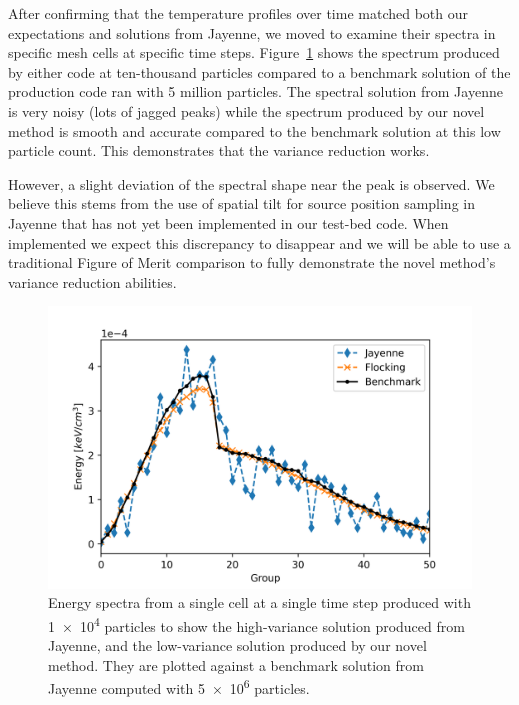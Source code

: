 After confirming that the temperature profiles over time matched both our expectations and solutions from Jayenne, we moved to examine their spectra in specific mesh cells at specific time steps. 
Figure~\ref{fig:10kvar} shows the spectrum produced by either code at ten-thousand particles compared to a benchmark solution of the production code ran with 5 million particles. 
The spectral solution from Jayenne is very noisy (lots of jagged peaks) while the spectrum produced by our novel method is smooth and accurate compared to the benchmark solution at this low particle count.
This demonstrates that the variance reduction works.

However, a slight deviation of the spectral shape near the peak is observed.
We believe this stems from the use of spatial tilt for source position sampling in Jayenne that has not yet been implemented in our test-bed code.
When implemented we expect this discrepancy to disappear and we will be able to use a traditional Figure of Merit comparison to fully demonstrate the novel method's variance reduction abilities.

\begin{figure}
    \begin{center}
        \includegraphics[width=\textwidth]{appendix/trt_figs/spectra_report.png}
        \caption{Energy spectra from a single cell at a single time step produced with \num{1e4} particles to show the high-variance solution produced from Jayenne, and the low-variance solution produced by our novel method. They are plotted against a benchmark solution from Jayenne computed with \num{5e6} particles.}
        \label{fig:10kvar}
    \end{center}
\end{figure}

